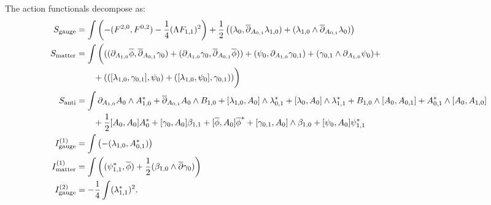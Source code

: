 \documentclass[10pt, oneside]{article}
\begin{document}
The action functionals decompose as:
\begin{align*}
S_{\mathrm{gauge}} &= \int \left(-(F^{2, 0}, F^{0, 2}) - \frac{1}{4}(\Lambda F_{1, 1})^2\right) + \frac 12 \left((\lambda_0 , \overline{\partial}_{A_{0,1}} \lambda_{1,0}) +(\lambda_{1,0} \wedge \overline{\partial}_{A_{0,1}} \lambda_{0})  \right)  \\
S_{\mathrm{matter}} &= \int \bigg( ((\partial_{A_{1,0}}\overline{\phi} , \overline{\partial}_{A_{0,1}} \gamma_0) + (\partial_{A_{1,0}}\gamma_0, \overline{\partial}_{A_{0,1}} \overline{\phi})) + (\psi_0 , \partial_{A_{1,0}} \gamma_{0,1}) + (\gamma_{0,1} \wedge \partial_{A_{1,0}} \psi_{0})  + \\
&\qquad + (([\lambda_{1,0},\gamma_{0,1}],\psi_0) + ([\lambda_{1,0}, \psi_0], \gamma_{0,1}) )   \bigg) \\
S_{\mathrm{anti}} &= \int \partial_{A_{1, 0}} A_0 \wedge A_{1,0}^* + \overline{\partial}_{A_{0, 1}} A_0\wedge B_{1,0} + [\lambda_{1,0}, A_0]\wedge \lambda_{0,1}^* +  [\lambda_{0}, A_0]\wedge \lambda_{1,1}^* +B_{1,0} \wedge [A_0, A_{0,1}] + A_{0,1}^* \wedge [A_{0}, A_{1,0}] \\
&\qquad + \frac{1}{2}[A_0, A_0]A_0^* + [\gamma_0, A_0] \beta_{1,1} + [\overline{\phi}, A_0] \overline{\phi}^* + [\gamma_{0,1}, A_0]\wedge \beta_{1,0} + [\psi_0, A_0] \psi_{1,1}^* \\
I^{(1)}_{\mathrm{gauge}} &=  \int \left( - (\lambda_{1,0}, A_{0,1}^*) \right)\\
I^{(1)}_{\mathrm{matter}} &=  \int \left( (\psi_{1,1}^*, \overline{\phi}) + \frac 12(\beta_{1,0} \wedge \overline{\partial} \gamma_0) \right)\\
I^{(2)}_{\mathrm{gauge}} &= -\frac{1}{4}\int (\lambda_{1,1}^*)^2.
\end{align*}
\end{document}
